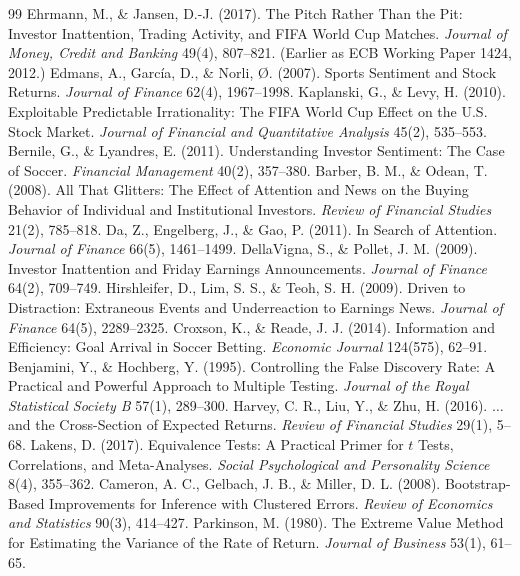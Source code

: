 \documentclass[12pt]{article}
\begin{document}
\begin{thebibliography}{99}
 Ehrmann, M., \& Jansen, D.-J. (2017). The Pitch Rather Than the Pit: Investor Inattention, Trading Activity, and FIFA World Cup Matches. \textit{Journal of Money, Credit and Banking} 49(4), 807--821. (Earlier as ECB Working Paper 1424, 2012.)
 Edmans, A., Garc\'ia, D., \& Norli, \O. (2007). Sports Sentiment and Stock Returns. \textit{Journal of Finance} 62(4), 1967--1998.
 Kaplanski, G., \& Levy, H. (2010). Exploitable Predictable Irrationality: The FIFA World Cup Effect on the U.S. Stock Market. \textit{Journal of Financial and Quantitative Analysis} 45(2), 535--553.
 Bernile, G., \& Lyandres, E. (2011). Understanding Investor Sentiment: The Case of Soccer. \textit{Financial Management} 40(2), 357--380.
 Barber, B. M., \& Odean, T. (2008). All That Glitters: The Effect of Attention and News on the Buying Behavior of Individual and Institutional Investors. \textit{Review of Financial Studies} 21(2), 785--818.
 Da, Z., Engelberg, J., \& Gao, P. (2011). In Search of Attention. \textit{Journal of Finance} 66(5), 1461--1499.
 DellaVigna, S., \& Pollet, J. M. (2009). Investor Inattention and Friday Earnings Announcements. \textit{Journal of Finance} 64(2), 709--749.
 Hirshleifer, D., Lim, S. S., \& Teoh, S. H. (2009). Driven to Distraction: Extraneous Events and Underreaction to Earnings News. \textit{Journal of Finance} 64(5), 2289--2325.
 Croxson, K., \& Reade, J. J. (2014). Information and Efficiency: Goal Arrival in Soccer Betting. \textit{Economic Journal} 124(575), 62--91.
 Benjamini, Y., \& Hochberg, Y. (1995). Controlling the False Discovery Rate: A Practical and Powerful Approach to Multiple Testing. \textit{Journal of the Royal Statistical Society B} 57(1), 289--300.
 Harvey, C. R., Liu, Y., \& Zhu, H. (2016). $\ldots$ and the Cross-Section of Expected Returns. \textit{Review of Financial Studies} 29(1), 5--68.
 Lakens, D. (2017). Equivalence Tests: A Practical Primer for $t$ Tests, Correlations, and Meta-Analyses. \textit{Social Psychological and Personality Science} 8(4), 355--362.
 Cameron, A. C., Gelbach, J. B., \& Miller, D. L. (2008). Bootstrap-Based Improvements for Inference with Clustered Errors. \textit{Review of Economics and Statistics} 90(3), 414--427.
 Parkinson, M. (1980). The Extreme Value Method for Estimating the Variance of the Rate of Return. \textit{Journal of Business} 53(1), 61--65.
\end{thebibliography}
\end{document}
